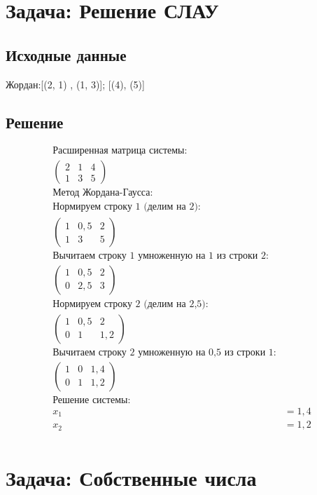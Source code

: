 \documentclass{article}
\begin{document}
\section{Задача: Решение СЛАУ}
\subsection{Исходные данные}
Жордан:[(2, 1) ,  (1, 3)]; [(4),  (5)]
\subsection{Решение}
\begin{align*}
\text{Расширенная матрица системы:}\\
\begin{pmatrix}
2 & 1 & 4\\
1 & 3 & 5\end{pmatrix}
\\
\text{Метод Жордана-Гаусса:}\\
\text{Нормируем строку 1 (делим на 2):}\\
\begin{pmatrix}
1 & 0,5 & 2\\
1 & 3 & 5\end{pmatrix}
\\
\text{Вычитаем строку 1 умноженную на 1 из строки 2:}\\
\begin{pmatrix}
1 & 0,5 & 2\\
0 & 2,5 & 3\end{pmatrix}
\\
\text{Нормируем строку 2 (делим на 2,5):}\\
\begin{pmatrix}
1 & 0,5 & 2\\
0 & 1 & 1,2\end{pmatrix}
\\
\text{Вычитаем строку 2 умноженную на 0,5 из строки 1:}\\
\begin{pmatrix}
1 & 0 & 1,4\\
0 & 1 & 1,2\end{pmatrix}
\\
\text{Решение системы:}\\
x_1 &= 1,4\\
x_2 &= 1,2\\
\end{align*}
\section{Задача: Собственные числа}
\end{document}
